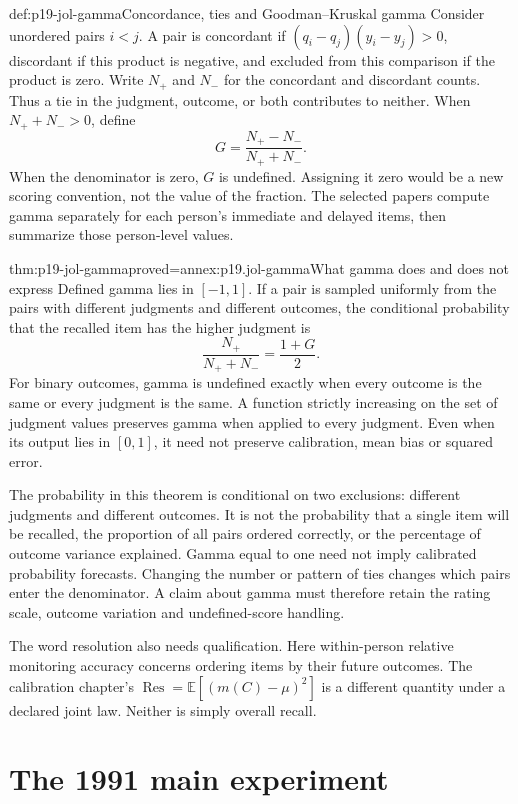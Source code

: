 \begin{hbdefinition}{def:p19-jol-gamma}{Concordance, ties and Goodman--Kruskal gamma}
Consider unordered pairs \(i<j\). A pair is concordant if
\((q_i-q_j)(y_i-y_j)>0\), discordant if this product is negative,
and excluded from this comparison if the product is zero.
Write \(N_+\) and \(N_-\) for the concordant and discordant counts.
Thus a tie in the judgment, outcome, or both contributes to neither.
When \(N_++N_->0\), define
\[
 G=\frac{N_+-N_-}{N_++N_-}.
\]
When the denominator is zero, \(G\) is undefined. Assigning it zero
would be a new scoring convention, not the value of the fraction.
The selected papers compute gamma separately for each person's
immediate and delayed items, then summarize those person-level values.
\end{hbdefinition}

\begin{hbtheorem}{thm:p19-jol-gamma}{proved=annex:p19.jol-gamma}{What gamma does and does not express}
Defined gamma lies in \([-1,1]\). If a pair is sampled uniformly
from the pairs with different judgments and different outcomes,
the conditional probability that the recalled item has the higher
judgment is
\[
 \frac{N_+}{N_++N_-}=\frac{1+G}{2}.
\]
For binary outcomes, gamma is undefined exactly when every outcome
is the same or every judgment is the same.
A function strictly increasing on the set of judgment values preserves
gamma when applied to every judgment. Even when its output lies in
\([0,1]\), it need not preserve calibration, mean bias or squared error.
\end{hbtheorem}

The probability in this theorem is conditional on two exclusions:
different judgments and different outcomes. It is not the probability
that a single item will be recalled, the proportion of all pairs
ordered correctly, or the percentage of outcome variance explained.
Gamma equal to one need not imply calibrated probability forecasts.
Changing the number or pattern of ties changes which pairs enter
the denominator. A claim about gamma must therefore retain the
rating scale, outcome variation and undefined-score handling.

The word resolution also needs qualification. Here within-person
relative monitoring accuracy concerns ordering items by their future
outcomes. The calibration chapter's
\(\operatorname{Res}=\mathbb E[(m(C)-\mu)^2]\) is a different
quantity under a declared joint law. Neither is simply overall recall.

\section{The 1991 main experiment}
\label{sec:p19-jol-1991-main}

